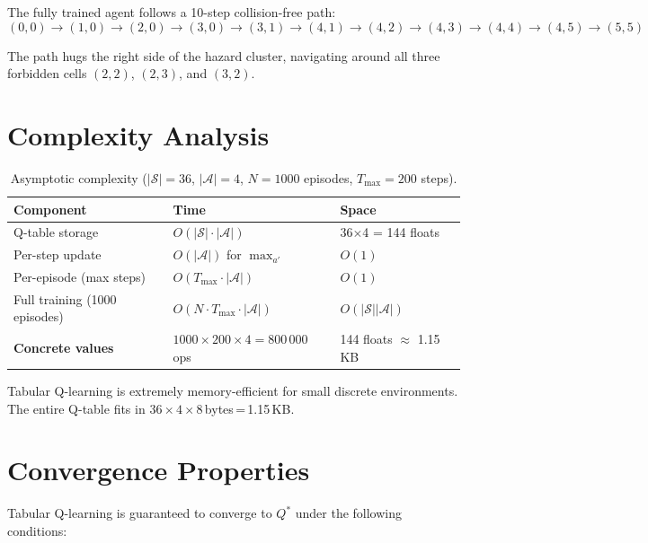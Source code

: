 \documentclass[12pt]{article}
\begin{document}
The fully trained agent follows a 10-step collision-free path:
\[
(0,0) \to (1,0) \to (2,0) \to (3,0) \to (3,1) \to (4,1)
      \to (4,2) \to (4,3) \to (4,4) \to (4,5) \to (5,5)
\]

The path hugs the right side of the hazard cluster, navigating around all
three forbidden cells $(2,2)$, $(2,3)$, and $(3,2)$.

\section{Complexity Analysis}

\begin{table}[H]
\centering
\begin{tabular}{@{} l l l @{}}
\toprule
\textbf{Component} & \textbf{Time} & \textbf{Space} \\
\midrule
Q-table storage              & $O(|\mathcal{S}| \cdot |\mathcal{A}|)$ & 36$\times$4 = 144 floats \\
Per-step update              & $O(|\mathcal{A}|)$ for $\max_{a'}$      & $O(1)$ \\
Per-episode (max steps)      & $O(T_{\max} \cdot |\mathcal{A}|)$       & $O(1)$ \\
Full training (1000 episodes)& $O(N \cdot T_{\max} \cdot |\mathcal{A}|)$ & $O(|\mathcal{S}||\mathcal{A}|)$ \\
\midrule
\textbf{Concrete values} & $1000 \times 200 \times 4 = 800\,000$ ops & 144 floats $\approx$ 1.15\,KB \\
\bottomrule
\end{tabular}
\caption{Asymptotic complexity ($|\mathcal{S}|=36$, $|\mathcal{A}|=4$,
         $N=1000$ episodes, $T_{\max}=200$ steps).}
\end{table}

Tabular Q-learning is extremely memory-efficient for small discrete
environments. The entire Q-table fits in $36 \times 4 \times 8$\,bytes\,=\,1.15\,KB.

\section{Convergence Properties}

Tabular Q-learning is guaranteed to converge to $Q^*$ under the following
conditions:
\end{document}
